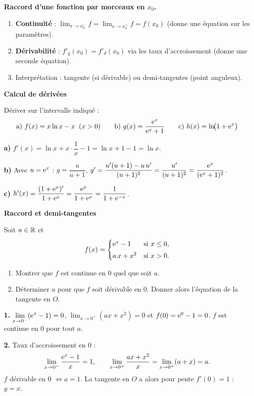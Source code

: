 \begin{methode}
	\textbf{Raccord d'une fonction par morceaux en $x_0$.}
	\begin{enumerate}
		\item \textbf{Continuité} : $\lim_{x\to x_0^-}f=\lim_{x\to x_0^+}f=f(x_0)$
		(donne une équation sur les paramètres).
		\item \textbf{Dérivabilité} : $f'_g(x_0)=f'_d(x_0)$ via les taux
		d'accroissement (donne une seconde équation).
		\item Interprétation : tangente (si dérivable) ou demi-tangentes
		(point anguleux).
	\end{enumerate}
\end{methode}

\exerciceresolu
\textbf{Calcul de dérivées}

Dériver sur l'intervalle indiqué :
\[
\text{a) } f(x)=x\ln x-x \;\;(x>0)
\qquad
\text{b) } g(x)=\frac{\mathrm{e}^{x}}{\mathrm{e}^{x}+1}
\qquad
\text{c) } h(x)=\ln\!\bigl(1+\mathrm{e}^{x}\bigr)
\]

\solution

\textbf{a)} $f'(x)=\ln x+x\cdot\dfrac1x-1=\ln x+1-1=\ln x$.

\textbf{b)} Avec $u=\mathrm{e}^{x}$ : $g=\dfrac{u}{u+1}$,
$g'=\dfrac{u'(u+1)-u\,u'}{(u+1)^{2}}=\dfrac{u'}{(u+1)^{2}}
=\dfrac{\mathrm{e}^{x}}{(\mathrm{e}^{x}+1)^{2}}$.

\textbf{c)} $h'(x)=\dfrac{(1+\mathrm{e}^{x})'}{1+\mathrm{e}^{x}}=\dfrac{\mathrm{e}^{x}}{1+\mathrm{e}^{x}}
=\dfrac{1}{1+\mathrm{e}^{-x}}$.

\bigskip
\exerciceresolu
\textbf{Raccord et demi-tangentes}

Soit $a\in\mathbb{R}$ et
\[
f(x)=
\begin{cases}
	\mathrm{e}^{x}-1 & \text{si } x\leq 0,\\[0.3em]
	a\,x+x^{2} & \text{si } x>0.
\end{cases}
\]
\begin{enumerate}
	\item Montrer que $f$ est continue en $0$ quel que soit $a$.
	\item Déterminer $a$ pour que $f$ soit dérivable en $0$. Donner alors
	l'équation de la tangente en $O$.
\end{enumerate}

\solution

\textbf{1.} $\displaystyle\lim_{x\to 0^-}(\mathrm{e}^{x}-1)=0$,
$\displaystyle\lim_{x\to 0^+}(ax+x^{2})=0$ et $f(0)=\mathrm{e}^{0}-1=0$. $f$ est
continue en $0$ pour tout $a$.

\textbf{2.} Taux d'accroissement en $0$ :
\[
\lim_{x\to 0^-}\frac{\mathrm{e}^{x}-1}{x}=1,\qquad
\lim_{x\to 0^+}\frac{ax+x^{2}}{x}=\lim_{x\to 0^+}(a+x)=a.
\]
$f$ dérivable en $0$ $\iff a=1$. La tangente en $O$ a alors pour pente
$f'(0)=1$ : $y=x$.

